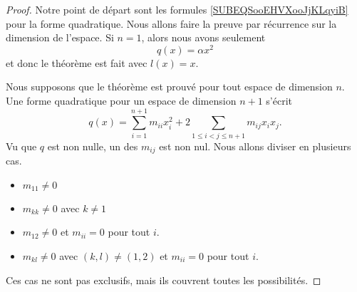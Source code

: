 \begin{proof}
    Notre point de départ sont les formules \eqref{SUBEQSooEHVXooJjKLqyiB} pour la forme quadratique. Nous allons faire la preuve par récurrence sur la dimension de l'espace. Si \( n=1\), alors nous avons seulement
    \begin{equation}
        q(x)=\alpha x^2
    \end{equation}
    et donc le théorème est fait avec \( l(x)=x\).

    Nous supposons que le théorème est prouvé pour tout espace de dimension \( n\). Une forme quadratique pour un espace de dimension \( n+1\) s'écrit
    \begin{equation}
        q(x)=\sum_{i=1}^{n+1}m_{ii}x_i^2+2\sum_{1\leq i < j\leq n+1}m_{ij}x_ix_j.
    \end{equation}
    Vu que \( q\) est non nulle, un des \( m_{ij}\) est non nul. Nous allons diviser en plusieurs cas.
    \begin{itemize}
        \item
            \( m_{11}\neq 0\)
        \item
            \( m_{kk}\neq 0\) avec \( k\neq 1\)
        \item
            \( m_{12}\neq 0\) et \( m_{ii}=0\) pour tout \( i\).
        \item
            \( m_{kl}\neq 0\) avec \( (k,l)\neq (1,2)\) et \( m_{ii}=0\) pour tout \( i\).
    \end{itemize}
    Ces cas ne sont pas exclusifs, mais ils couvrent toutes les possibilités.


\end{proof}
